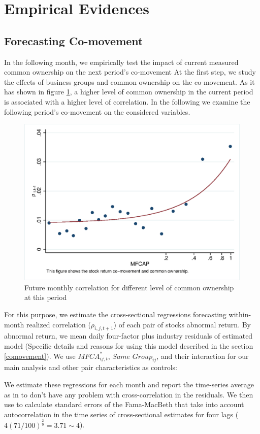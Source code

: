 
\section{Empirical Evidences}



\subsection{{Forecasting Co-movement}}
\label{Forecasting Co-movement}

	In the following month, we empirically test the impact of current measured
	common ownership on the next period’s co-movement
	At the first step, we study the effects of business groups and common ownership on the co-movement. As it has shown in figure \ref{mcorr50}, a higher level of common	ownership in the current period is associated with a higher level of correlation. In the following we examine the following period's co-movement on the considered variables.
	\begin{figure}[htbp]
	\centering  
	\centering
	\includegraphics[width=0.7\linewidth]{"Output/mcorr50.eps"} 
	\caption{Future monthly correlation for different level of common ownership at this period }
	\label{mcorr50}
\end{figure}
	
	For this purpose, we estimate the cross-sectional regressions forecasting within-month realized correlation ($\rho_{i,j,t+1}$) of each pair of stocks abnormal return. By abnormal return, we mean daily four-factor plus industry residuals of estimated model (Specific details and reasons for using this model described in the section \ref{comovement}). We use $\textit{MFCA}^*_{ij,t}$, $\textit{Same Group}_{ij} $, and their interaction for our main analysis and other pair characteristics as controls:
		

	
	We estimate these regressions for each month and report the time-series average as in \cite{FamaMacBeth} to don't have any problem with cross-correlation in the residuals. We then use  \cite{newey1987hypothesis} to calculate standard errors of the Fama-MacBeth that take into account autocorrelation in the time series of cross-sectional estimates for four lags ($ 4(71/100)^{\frac{2}{9}} = 3.71 \sim 4 $).
	
